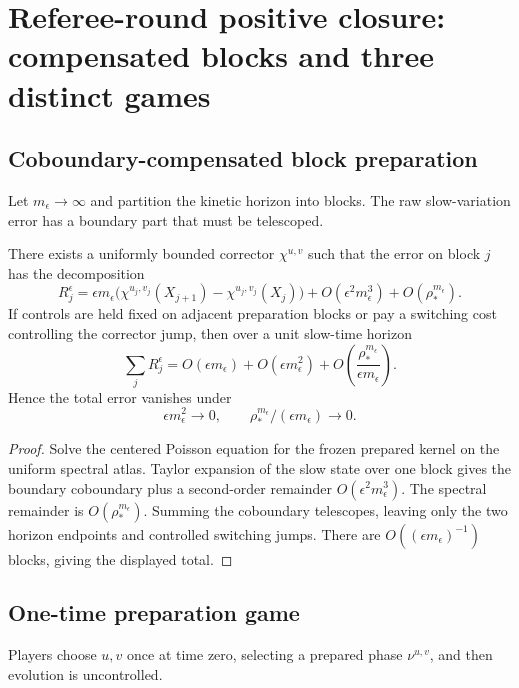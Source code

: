 \section{Referee-round positive closure: compensated blocks and three distinct games}
\label{sec:rr2-c1}

\subsection{Coboundary-compensated block preparation}

Let \(m_\epsilon\to\infty\) and partition the kinetic horizon into blocks.
The raw slow-variation error has a boundary part that must be telescoped.

\begin{lemma}
\label{lem:rr2-c1-block}
There exists a uniformly bounded corrector \(\chi^{u,v}\) such that the error
on block \(j\) has the decomposition
\[
 R_j^\epsilon
 =
 \epsilon m_\epsilon
 \big(\chi^{u_j,v_j}(X_{j+1})-\chi^{u_j,v_j}(X_j)\big)
 +O(\epsilon^2m_\epsilon^3)
 +O(\rho_*^{m_\epsilon}).
\]
If controls are held fixed on adjacent preparation blocks or pay a switching
cost controlling the corrector jump, then over a unit slow-time horizon
\[
 \sum_jR_j^\epsilon
 =
 O(\epsilon m_\epsilon)
 +O(\epsilon m_\epsilon^2)
 +O\!\left(\frac{\rho_*^{m_\epsilon}}
 {\epsilon m_\epsilon}\right).
\]
Hence the total error vanishes under
\[
 \epsilon m_\epsilon^2\to0,\qquad
 \rho_*^{m_\epsilon}/(\epsilon m_\epsilon)\to0.
\]
\end{lemma}

\begin{proof}
Solve the centered Poisson equation for the frozen prepared kernel on the
uniform spectral atlas.  Taylor expansion of the slow state over one block
gives the boundary coboundary plus a second-order remainder
\(O(\epsilon^2m_\epsilon^3)\).  The spectral remainder is
\(O(\rho_*^{m_\epsilon})\).  Summing the coboundary telescopes, leaving only
the two horizon endpoints and controlled switching jumps.  There are
\(O((\epsilon m_\epsilon)^{-1})\) blocks, giving the displayed total.
\end{proof}

\subsection{One-time preparation game}

Players choose \(u,v\) once at time zero, selecting a prepared phase
\(\nu^{u,v}\), and then evolution is uncontrolled.


